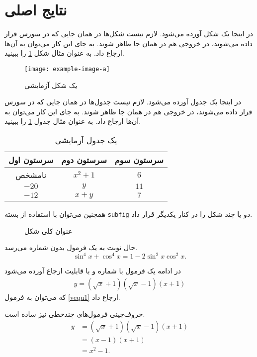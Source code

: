 \documentclass[aimcpersian]{aimc46}
\begin{document}
\section{نتایج اصلی}
در اینجا یک شکل آورده می‌شود. لازم نیست شکل‌ها در همان‌ جایی که در سورس قرار داده می‌شوند، در خروجی هم در همان جا
ظاهر شوند. به جای این کار می‌توان به آن‌ها ارجاع داد. به عنوان مثال شکل  \ref{vfig1} را ببینید.
\begin{figure}[!h]
\centering
\texttt{[image: example-image-a]}
\caption{یک شکل آزمایشی}\label{vfig1}
\end{figure}


در اینجا یک جدول آورده می‌شود. لازم نیست جدول‌ها در همان‌ جایی که در سورس قرار داده می‌شوند، در خروجی هم در همان جا
ظاهر شوند. به جای این کار می‌توان به آن‌ها ارجاع داد. به عنوان مثال جدول \ref{vtab1} را ببینید.
\begin{table}[!h]
\centering
\caption{یک جدول آزمایشی}\label{vtab1}
\begin{tabular}{ccc}
\hline
سرستون اول & سرستون دوم & سرستون سوم \\ \hline
نامشخص & $x^2+1$ & $6$ \\ 
$-20$ & $y$ & $11$ \\
$-12$ & $x+y$ & $7$\\
 \hline
\end{tabular} 
\end{table}

همچنین می‌توان با استفاده از بسته \texttt{subfig} دو یا چند شکل را در کنار یکدیگر قرار داد.
\begin{figure}[!ht]
\centering
{}
\quad
{}
\caption{عنوان کلی شکل}
\label{vfig2}
\end{figure}

حال نوبت به یک فرمول بدون شماره می‌رسد.
\[
\sin^4 x+\cos^4 x=1-2\sin^2 x\cos^2 x.
\]

در ادامه یک فرمول با شماره و با قابلیت ارجاع آورده می‌شود
\begin{align}\label{vequ1}
y=(\sqrt{x}+1)(\sqrt{x}-1)(x+1)
\end{align}
که می‌توان به فرمول \eqref{vequ1} ارجاع داد.

حروف‌چینی فرمول‌های چندخطی نیز ساده است.
\begin{align*}
y&=(\sqrt{x}+1)(\sqrt{x}-1)(x+1)\\
&=(x-1)(x+1)\\
&=x^2 -1.
\end{align*}
\end{document}
